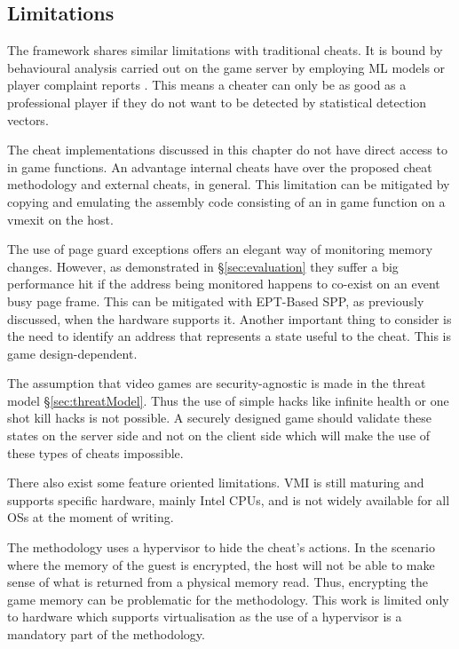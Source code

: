 \subsection{Limitations}
\label{sec:limitations}


The \frameworkName framework shares similar limitations with traditional cheats. It is bound by behavioural analysis carried out on the game server by employing ML models \cite{pinto2021deep,tao2020xai,spijkerman2020cheat} or player complaint reports \cite{eaCheatReporting}. This means a cheater can only be as good as a professional player if they do not want to be detected by statistical detection vectors. 

The cheat implementations discussed in this chapter do not have direct access to in game functions. An advantage internal cheats have over the proposed cheat methodology and external cheats, in general. This limitation can be mitigated by copying and emulating the assembly code consisting of an in game function on a vmexit on the host. 

The use of page guard exceptions offers an elegant way of monitoring memory changes. However, as demonstrated in \S \ref{sec:evaluation} they suffer a big performance hit if the address being monitored happens to co-exist on an event busy page frame.  This can be mitigated with EPT-Based SPP, as previously discussed, when the hardware supports it. Another important thing to consider is the need to identify an address that represents a state useful to the cheat. This is game design-dependent. 

The assumption that video games are security-agnostic is made in the threat model \S\ref{sec:threatModel}. Thus the use of simple hacks like infinite health or one shot kill hacks is not possible. A securely designed game should validate these states on the server side and not on the client side which will make the use of these types of cheats impossible.

There also exist some feature oriented limitations. VMI is still maturing and supports specific hardware, mainly Intel CPUs, and is not widely available for all OSs at the moment of writing.

The methodology uses a hypervisor to hide the cheat's actions. In the scenario where the memory of the guest is encrypted, the host will not be able to make sense of what is returned from a physical memory read. Thus, encrypting the game memory can be problematic for the methodology. This work is limited only to hardware which supports virtualisation as the use of a hypervisor is a mandatory part of the methodology.